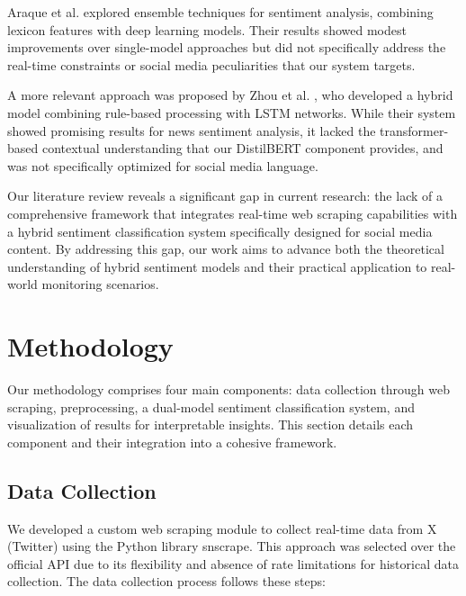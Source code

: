 \documentclass[conference]{IEEEtran}
\begin{document}
Araque et al. \cite{araque2017enhancing} explored ensemble techniques for sentiment analysis, combining lexicon features with deep learning models. Their results showed modest improvements over single-model approaches but did not specifically address the real-time constraints or social media peculiarities that our system targets.

A more relevant approach was proposed by Zhou et al. \cite{zhou2020hybrid}, who developed a hybrid model combining rule-based processing with LSTM networks. While their system showed promising results for news sentiment analysis, it lacked the transformer-based contextual understanding that our DistilBERT component provides, and was not specifically optimized for social media language.

Our literature review reveals a significant gap in current research: the lack of a comprehensive framework that integrates real-time web scraping capabilities with a hybrid sentiment classification system specifically designed for social media content. By addressing this gap, our work aims to advance both the theoretical understanding of hybrid sentiment models and their practical application to real-world monitoring scenarios.

\section{Methodology}
Our methodology comprises four main components: data collection through web scraping, preprocessing, a dual-model sentiment classification system, and visualization of results for interpretable insights. This section details each component and their integration into a cohesive framework.

\subsection{Data Collection}
We developed a custom web scraping module to collect real-time data from X (Twitter) using the Python library snscrape. This approach was selected over the official API due to its flexibility and absence of rate limitations for historical data collection. The data collection process follows these steps:
\end{document}
